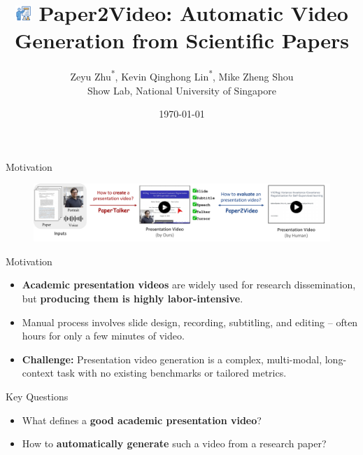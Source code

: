\documentclass{beamer}
\title[Paper2Video]{\includegraphics[height=0.6cm]{figure/logo_.png} Paper2Video: Automatic Video Generation from Scientific Papers}
\author[Zeyu Zhu, Kevin Q. Lin, Mike Z. Shou]{
  Zeyu Zhu\textsuperscript{*}, Kevin Qinghong Lin\textsuperscript{*}, Mike Zheng Shou\Letter \\
  {\small Show Lab, National University of Singapore}
}
\date{\today}
\newcommand{\alertterm}[1]{\alert{\textbf{#1}}}
\begin{document}
\begin{frame}
  \titlepage
\end{frame}

\begin{frame}{Motivation}
  \begin{figure}
      \centering
      \includegraphics[width=1\linewidth]{figure/teaser.pdf}
      \vspace{-1\baselineskip}
      \label{fig:placeholder}
  \end{figure}
  \vspace{-1\baselineskip}
 \begin{block}{\small Motivation}
 \footnotesize
  \begin{itemize}
    \item \textbf{Academic presentation videos} are widely used for research dissemination, but \alertterm{producing them is highly labor-intensive}.
    \item Manual process involves slide design, recording, subtitling, and editing -- often hours for only a few minutes of video.
    \item \alertterm{Challenge:} Presentation video generation is a complex, multi-modal, long-context task with no existing benchmarks or tailored metrics.
  \end{itemize}
  \end{block}
  \begin{block}{\small Key Questions}
    \footnotesize
    \begin{itemize}
      \item What defines a \alertterm{good academic presentation video}?
      \item How to \alertterm{automatically generate} such a video from a research paper?
    \end{itemize}
  \end{block}
\end{frame}
\end{document}
